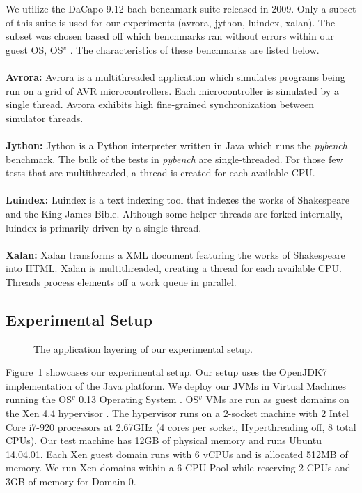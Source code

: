 \documentclass{sig-alternate}
\begin{document}
We utilize the DaCapo 9.12 bach benchmark suite released in 2009. Only a subset of this suite is used for our experiments (avrora, jython, luindex, xalan). The subset was chosen based off which benchmarks ran without errors within our guest OS, OS$^{v}$ \cite{aviOSv2014}. The characteristics of these benchmarks are listed below.
\\\\
\textbf{Avrora:} Avrora is a multithreaded application which simulates programs being run on a grid of AVR microcontrollers. Each microcontroller is simulated by a single thread. Avrora exhibits high fine-grained synchronization between simulator threads.
\\\\
\textbf{Jython:} Jython is a Python interpreter written in Java which runs the \textit{pybench} benchmark. The bulk of the tests in \textit{pybench} are single-threaded. For those few tests that are multithreaded, a thread is created for each available CPU. 
\\\\
\textbf{Luindex:} Luindex is a text indexing tool that indexes the works of Shakespeare and the King James Bible. Although some helper threads are forked internally, luindex is primarily driven by a single thread.
\\\\
\textbf{Xalan:} Xalan transforms a XML document featuring the works of Shakespeare into HTML. Xalan is multithreaded, creating a thread for each available CPU. Threads process elements off a work queue in parallel.

\subsection{Experimental Setup}\label{subsec:expsetup}
\begin{figure}
\centering
{}
\caption{The application layering of our experimental setup.}
\label{fig:dacaposetup}
\end{figure}

Figure~\ref{fig:dacaposetup} showcases our experimental setup. Our setup uses the OpenJDK7 implementation of the Java platform. We deploy our JVMs in Virtual Machines running the OS$^{v}$ 0.13 Operating System \cite{aviOSv2014}. OS$^{v}$ VMs are run as guest domains on the Xen 4.4 hypervisor \cite{barham2003xen}. The hypervisor runs on a 2-socket machine with 2 Intel Core i7-920 processors at 2.67GHz (4 cores per socket, Hyperthreading off,  8 total CPUs).  Our test machine has 12GB of physical memory and runs Ubuntu 14.04.01. Each Xen guest domain runs with 6 vCPUs and is allocated 512MB of memory. We run Xen domains within a 6-CPU Pool while reserving 2 CPUs and 3GB of memory for Domain-0.  
\end{document}
